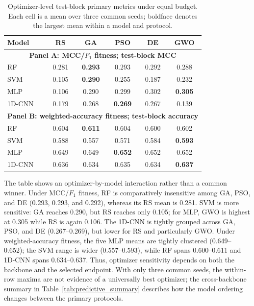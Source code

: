 \begin{table}[htbp]
\centering
\caption{Optimizer-level test-block primary metrics under equal budget. Each cell is a mean over three common seeds; boldface denotes the largest mean within a model and protocol.}
\label{tab:optimizer_primary_metrics}
\manuscripttablestyle
\begin{tabular}{lccccc}\toprule
\textbf{Model} & \textbf{RS} & \textbf{GA} & \textbf{PSO} & \textbf{DE} & \textbf{GWO}\\\midrule
\multicolumn{6}{c}{\textbf{Panel A: MCC/$F_1$ fitness; test-block MCC}}\\\midrule
RF & 0.281 & \textbf{0.293} & 0.293 & 0.292 & 0.288\\
SVM & 0.105 & \textbf{0.290} & 0.255 & 0.187 & 0.232\\
MLP & 0.106 & 0.290 & 0.299 & 0.302 & \textbf{0.305}\\
1D-CNN & 0.179 & 0.268 & \textbf{0.269} & 0.267 & 0.139\\\midrule
\multicolumn{6}{c}{\textbf{Panel B: weighted-accuracy fitness; test-block accuracy}}\\\midrule
RF & 0.604 & \textbf{0.611} & 0.604 & 0.600 & 0.602\\
SVM & 0.588 & 0.557 & 0.571 & 0.584 & \textbf{0.593}\\
MLP & 0.649 & 0.649 & \textbf{0.652} & 0.652 & 0.652\\
1D-CNN & 0.636 & 0.634 & 0.635 & 0.634 & \textbf{0.637}\\\bottomrule
\end{tabular}
\end{table}

The table shows an optimizer-by-model interaction rather than a common winner. Under MCC/$F_1$ fitness, RF is comparatively insensitive among GA, PSO, and DE (0.293, 0.293, and 0.292), whereas its RS mean is 0.281. SVM is more sensitive: GA reaches 0.290, but RS reaches only 0.105; for MLP, GWO is highest at 0.305 while RS is again 0.106. The 1D-CNN is tightly grouped across GA, PSO, and DE (0.267--0.269), but lower for RS and particularly GWO. Under weighted-accuracy fitness, the five MLP means are tightly clustered (0.649--0.652); the SVM range is wider (0.557--0.593), while RF spans 0.600--0.611 and 1D-CNN spans 0.634--0.637. Thus, optimizer sensitivity depends on both the backbone and the selected endpoint. With only three common seeds, the within-row maxima are not evidence of a universally best optimizer; the cross-backbone summary in Table~\ref{tab:predictive_summary} describes how the model ordering changes between the primary protocols.

